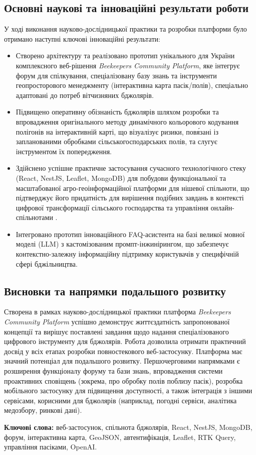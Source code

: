 \subsection*{Основні наукові та інноваційні результати роботи}
У ході виконання науково-дослідницької практики та розробки платформи було отримано наступні ключові інноваційні результати:
\begin{itemize}
    \item Створено архітектуру та реалізовано прототип унікального для України комплексного веб-рішення \textit{Beekeepers Community Platform}, яке інтегрує форум для спілкування, спеціалізовану базу знань та інструменти геопросторового менеджменту (інтерактивна карта пасік/полів), спеціально адаптовані до потреб вітчизняних бджолярів.
    \item Підвищено оперативну обізнаність бджолярів шляхом розробки та впровадження оригінального методу динамічного кольорового кодування полігонів на інтерактивній карті, що візуалізує ризики, пов\'язані із запланованими обробками сільськогосподарських полів, та слугує інструментом їх попередження.
    \item Здійснено успішне практичне застосування сучасного технологічного стеку (React, NestJS, Leaflet, MongoDB) для побудови функціональної та масштабованої агро-геоінформаційної платформи для нішевої спільноти, що підтверджує його придатність для вирішення подібних завдань в контексті цифрової трансформації сільського господарства та управління онлайн-спільнотами \cite{preece2005onlinecommunities, huet2022digitalbeekeeping, guruprasad2024beeopen}.
    \item Інтегровано прототип інноваційного FAQ-асистента на базі великої мовної моделі (LLM) з кастомізованим промпт-інжинірингом, що забезпечує контекстно-залежну інформаційну підтримку користувачів у специфічній сфері бджільництва.
\end{itemize}

\subsection*{Висновки та напрямки подальшого розвитку}
Створена в рамках науково-дослідницької практики платформа \textit{Beekeepers Community Platform} успішно демонструє життєздатність запропонованої концепції та вирішує поставлені завдання щодо надання спеціалізованого цифрового інструменту для бджолярів. Робота дозволила отримати практичний досвід у всіх етапах розробки повностекового веб-застосунку. Платформа має значний потенціал для подальшого розвитку. Першочерговими напрямками є розширення функціоналу форуму та бази знань, впровадження системи проактивних сповіщень (зокрема, про обробку полів поблизу пасік), розробка мобільного застосунку для підвищення доступності, а також інтеграція з іншими сервісами, корисними для бджолярів (наприклад, погодні сервіси, аналітика медозбору, ринкові дані).

\textbf{Ключові слова:} веб-застосунок, спільнота бджолярів, React, NestJS, MongoDB, форум, інтерактивна карта, GeoJSON, автентифікація, Leaflet, RTK Query, управління пасіками, OpenAI.

\newpage 